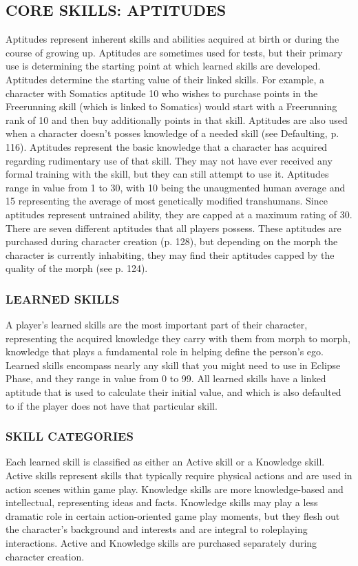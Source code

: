 \subsection{CORE SKILLS: APTITUDES}
Aptitudes represent inherent skills and abilities acquired
at birth or during the course of growing up. Aptitudes
are sometimes used for tests, but their primary use is
determining the starting point at which learned skills
are developed. Aptitudes determine the starting value
of their linked skills. For example, a character with
Somatics aptitude 10 who wishes to purchase points
in the Freerunning skill (which is linked to Somatics)
would start with a Freerunning rank of 10 and then
buy additionally points in that skill.
Aptitudes are also used when a character doesn’t
posses knowledge of a needed skill (see Defaulting, p.
116). Aptitudes represent the basic knowledge that a
character has acquired regarding rudimentary use of that
skill. They may not have ever received any formal training
with the skill, but they can still attempt to use it.
Aptitudes range in value from 1 to 30, with 10 being
the unaugmented human average and 15 representing
the average of most genetically modified transhumans.
Since aptitudes represent untrained ability, they are
capped at a maximum rating of 30.
There are seven different aptitudes that all players
possess. These aptitudes are purchased during character
creation (p. 128), but depending on the morph the
character is currently inhabiting, they may find their aptitudes
capped by the quality of the morph (see p. 124).

\subsubsection{LEARNED SKILLS}
A player’s learned skills are the most important part of
their character, representing the acquired knowledge
they carry with them from morph to morph, knowledge
that plays a fundamental role in helping define
the person’s ego. Learned skills encompass nearly any
skill that you might need to use in Eclipse Phase, and
they range in value from 0 to 99.
All learned skills have a linked aptitude that is
used to calculate their initial value, and which is
also defaulted to if the player does not have that
particular skill.


 \subsubsection{SKILL CATEGORIES}
Each learned skill is classified as either an Active skill
or a Knowledge skill. Active skills represent skills
that typically require physical actions and are used in
action scenes within game play. Knowledge skills are
more knowledge-based and intellectual, representing
ideas and facts. Knowledge skills may play a less dramatic role in certain action-oriented game play moments, but they flesh out the character’s background
and interests and are integral to roleplaying interactions. Active and Knowledge skills are purchased
separately during character creation.

